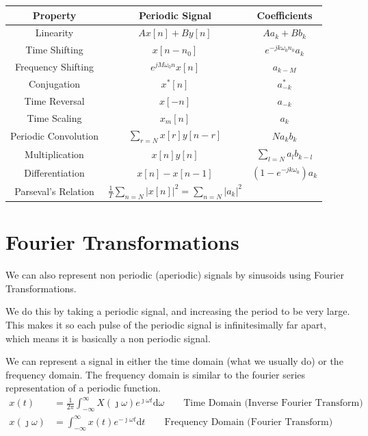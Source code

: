 \documentclass[12pt,letterpaper]{article} \usepackage{amsmath} \usepackage{graphicx} \usepackage[margin=1in]{geometry} \usepackage{longtable}  \usepackage{amssymb}
\begin{document}
	\begin{center}
		\begin{tabular}{|c||c|c|}
			\hline
			Property & Periodic Signal & Coefficients \\
			\hline\hline
			Linearity & $A x[n] + B y[n]$ & $A a_k + B b_k$ \\
			\hline
			Time Shifting & $x[n-n_0]$ & $e^{-jk\omega_0 n_0} a_k$ \\
			\hline
			Frequency Shifting & $e^{jM\omega_0 n} x[n]$ & $a_{k-M}$ \\
			\hline
			Conjugation & $x^*[n]$ & $a^*_{-k}$ \\
			\hline
			Time Reversal & $x[-n]$ & $a_{-k}$ \\
			\hline
			Time Scaling & $x_m[n]$ & $a_k$ \\
			\hline
			Periodic Convolution & $\sum_{r=N} x[r] y[n-r]$ & $N a_k b_k$ \\
			\hline
			Multiplication & $x[n] y[n]$ & $\sum_{l=N} a_l b_{k-l}$ \\
			\hline
			Differentiation & $x[n] - x[n-1]$ & $(1-e^{-jk\omega_0})a_k$ \\
			\hline
			Parseval's Relation & $\frac{1}{T} \sum_{n=N} |x[n]|^2 = \sum_{n=N} |a_k|^2$ &  \\
			\hline
		\end{tabular}
	\end{center}
	
	\section{Fourier Transformations}
	We can also represent non periodic (aperiodic) signals by sinusoids using Fourier Transformations.
	
	We do this by taking a periodic signal, and increasing the period to be very large. This makes it so each pulse of the periodic signal is infinitesimally far apart, which means it is basically a non periodic signal.
	
	We can represent a signal in either the time domain (what we usually do) or the frequency domain. The frequency domain is similar to the fourier series representation of a periodic function. 
	\begin{align}
		x(t) &= \frac{1}{2\pi} \int_{-\infty}^\infty X(\jmath \omega) e^{\jmath\omega t}\mathrm d \omega \qquad \text{Time Domain (Inverse Fourier Transform)} \\
		x(\jmath \omega) &= \int^\infty_{-\infty} x(t) e^{-\jmath \omega t}\mathrm d t \qquad \text{Frequency Domain (Fourier Transform)}
	\end{align} 
	
\end{document}
